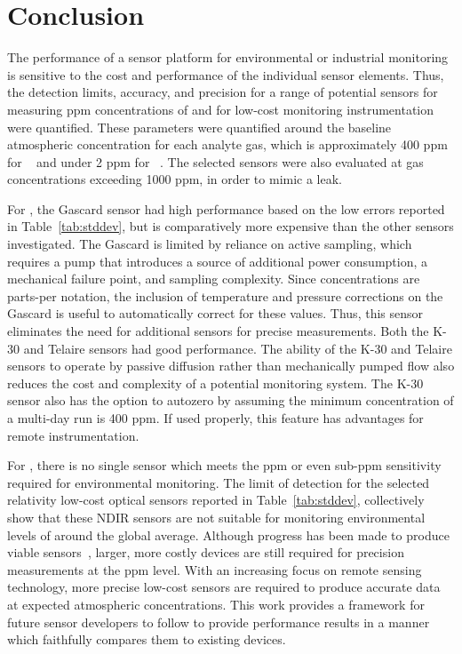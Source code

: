 \documentclass[sensors,article,submit,moreauthors,pdftex]{Definitions/mdpi}
\begin{document}
			
			\FloatBarrier	
	
	\section{Conclusion}
	
		The performance of a sensor platform for environmental or industrial monitoring is sensitive to the cost and performance of the individual sensor elements.
		Thus, the detection limits, accuracy, and precision for a range of potential sensors for measuring ppm concentrations of  and  for low-cost monitoring instrumentation were quantified.
		These parameters were quantified around the baseline atmospheric concentration for each analyte gas, which is approximately 400 ppm for ~\cite{blasing_recent_2016,dlugokencky_trends_2016} and under 2 ppm for ~\cite{turner_large_2016,bamberger_spatial_2014,dlugokencky_trends_2016-1}.
		The selected sensors were also evaluated at gas concentrations exceeding 1000 ppm, in order to mimic a leak.
			
		
		For , the Gascard sensor had high performance based on the low errors reported in Table~\ref{tab:stddev}, but is comparatively more expensive than the other sensors investigated.
		The Gascard is limited by reliance on active sampling, which requires a pump that introduces a source of additional power consumption, a mechanical failure point, and sampling complexity.
		Since concentrations are parts-per notation, the inclusion of temperature and pressure corrections on the Gascard is useful to automatically correct for these values.
		Thus, this sensor eliminates the need for additional sensors for precise measurements.
		Both the K-30 and Telaire sensors had good performance.
		The ability of the K-30 and Telaire sensors to operate by passive diffusion rather than mechanically pumped flow also reduces the cost and complexity of a potential monitoring system.
		The K-30 sensor also has the option to autozero by assuming the minimum concentration of a multi-day run is 400 ppm.
		If used properly, this feature has advantages for remote instrumentation.
		
		
		For , there is no single sensor which meets the ppm or even sub-ppm sensitivity required for environmental monitoring.
		The limit of detection for the selected relativity low-cost optical  sensors reported in Table~\ref{tab:stddev}, collectively show that these NDIR sensors are not suitable for monitoring environmental levels of  around the global average.
		Although progress has been made to produce viable sensors~\cite{zhu_one_2012}, larger, more costly devices are still required for precision measurements at the ppm level.
		With an increasing focus on remote sensing technology, more precise low-cost  sensors are required to produce accurate data at expected atmospheric concentrations.
		This work provides a framework for future sensor developers to follow to provide performance results in a manner which faithfully compares them to existing devices.
		
\end{document}
